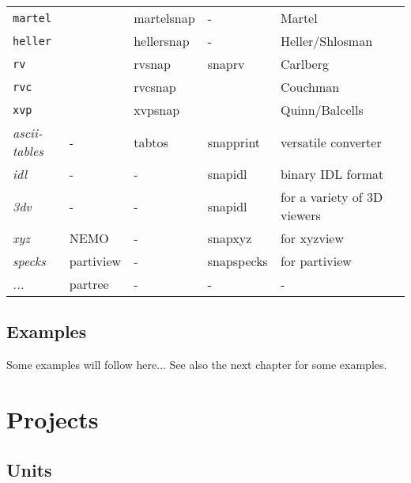 {\begin{center}
\begin{table}[h!]
\begin{tabular}{||l|l|l|l|l|l||}
{\tt martel}    &           &  martelsnap    &    -          &  Martel \\
{\tt heller}    &           &  hellersnap    &    -          &  Heller/Shlosman \\
{\tt rv}       &           &  rvsnap       &   snaprv      & Carlberg \\
{\tt rvc}       &           &  rvcsnap       &         &  Couchman \\
{\tt xvp}      &           &  xvpsnap       &         &  Quinn/Balcells \\

{\it ascii-tables}   &   -   &  tabtos    &    snapprint     &   versatile converter\\

{\it idl}         &    -     &     -      &    snapidl        &   binary IDL format  \\
{\it 3dv}         &    -     &     -      &    snapidl        &   for a variety of 3D viewers \\
{\it xyz}         &   NEMO    &     -      &    snapxyz        &  for xyzview \\
{\it specks}      &  partiview &     -      &    snapspecks      &  for partiview \\
{\it ...}       &  partree     &     -      &    -              &  - \\






\hline 




\end{tabular}
\end{table}
\end{center}

\section{Examples}

Some examples will follow here... See also the next chapter for some examples.



\chapter                {Projects}

\section{Units}

}
